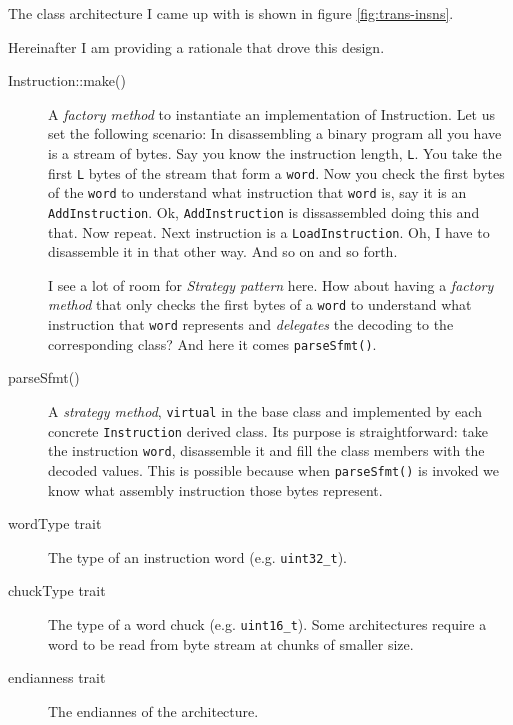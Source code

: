 \documentclass{article}
\begin{document}
The class architecture I came up with is shown in figure \ref{fig:trans-insns}.

Hereinafter I am providing a rationale that drove this design.
\begin{description}
\item[Instruction::make()] A \emph{factory method} to instantiate an implementation of Instruction. Let us set the following scenario: In disassembling a binary program all you have is a stream of bytes. Say you know the instruction length, \texttt{L}. You take the first \texttt{L} bytes of the stream that form a \texttt{word}. Now you check the first bytes of the \texttt{word} to understand what instruction that \texttt{word} is, say it is an \texttt{AddInstruction}. Ok, \texttt{AddInstruction} is dissassembled doing this and that. Now repeat. Next instruction is a \texttt{LoadInstruction}. Oh, I have to disassemble it in that other way. And so on and so forth.

I see a lot of room for \emph{Strategy pattern} here. How about having a \emph{factory method} that only checks the first bytes of a \texttt{word} to understand what instruction that \texttt{word} represents and \emph{delegates} the decoding to the corresponding class? And here it comes \texttt{parseSfmt()}.
\item[parseSfmt()] A \emph{strategy method}, \texttt{virtual} in the base class and implemented by each concrete \texttt{Instruction} derived class. Its purpose is straightforward: take the instruction \texttt{word}, disassemble it and fill the class members with the decoded values. This is possible because when \texttt{parseSfmt()} is invoked we know what assembly instruction those bytes represent.
\item[wordType trait] The type of an instruction word (e.g. \texttt{uint32\_t}).
\item[chuckType trait] The type of a word chuck (e.g. \texttt{uint16\_t}). Some architectures require a word to be read from byte stream at chunks of smaller size.
\item[endianness trait] The endiannes of the architecture.
\end{description}
\end{document}
